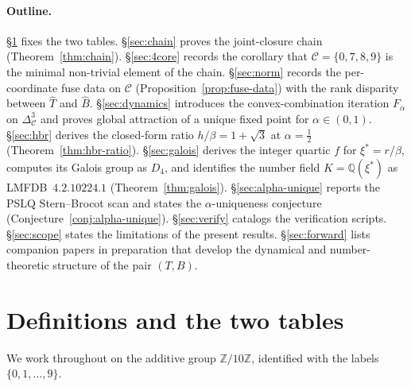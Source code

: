 \documentclass[11pt,reqno]{amsart}
\theoremstyle{plain}
\theoremstyle{definition}
\theoremstyle{remark}
\newcommand{\Z}{\mathbb{Z}}
\newcommand{\Q}{\mathbb{Q}}
\newcommand{\Zten}{\Z/10\Z}
\newcommand{\Cfour}{\mathcal{C}}
\newcommand{\Tfuse}{\widehat{T}}
\newcommand{\Bfuse}{\widehat{B}}
\begin{document}
\paragraph{Outline.} \S\ref{sec:setup} fixes the two tables.
\S\ref{sec:chain} proves the joint-closure chain
(Theorem~\ref{thm:chain}). \S\ref{sec:4core} records the
corollary that $\Cfour=\{0,7,8,9\}$ is the minimal non-trivial
element of the chain. \S\ref{sec:norm} records the per-coordinate
fuse data on $\Cfour$ (Proposition~\ref{prop:fuse-data}) with
the rank disparity between $\Tfuse$ and $\Bfuse$.
\S\ref{sec:dynamics} introduces the convex-combination iteration
$F_\alpha$ on $\Delta^{3}_{\Cfour}$ and proves global
attraction of a unique fixed point for $\alpha\in(0,1)$.
\S\ref{sec:hbr} derives the closed-form ratio $h/\beta = 1+\sqrt 3$
at $\alpha=\tfrac12$ (Theorem~\ref{thm:hbr-ratio}).
\S\ref{sec:galois} derives the integer quartic $f$ for $\xi^* =
r/\beta$, computes its Galois group as $D_{4}$, and identifies
the number field $K = \Q(\xi^*)$ as LMFDB~$4.2.10224.1$
(Theorem~\ref{thm:galois}). \S\ref{sec:alpha-unique} reports the
PSLQ Stern--Brocot scan and states the
$\alpha$-uniqueness conjecture
(Conjecture~\ref{conj:alpha-unique}).
\S\ref{sec:verify} catalogs the verification scripts.
\S\ref{sec:scope} states the limitations of the present results.
\S\ref{sec:forward} lists companion papers in preparation
that develop the dynamical and number-theoretic structure of the
pair $(T,B)$.

\section{Definitions and the two tables}\label{sec:setup}

We work throughout on the additive group $\Zten$, identified with
the labels $\{0,1,\dots,9\}$.
\end{document}
